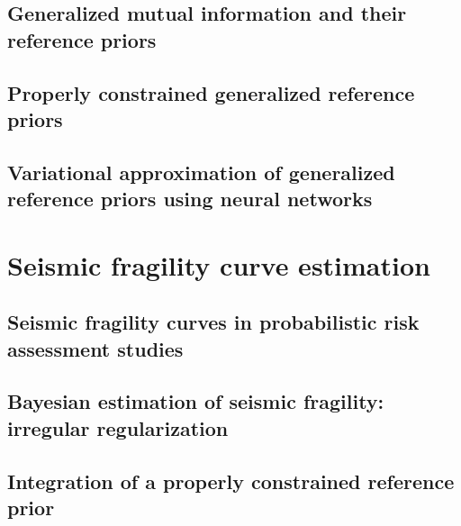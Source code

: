 \documentclass[a4paper]{book}
\begin{document}


\chapter{Generalized mutual information and their reference priors}\label{chap:ref-generalized}




\chapter{Properly constrained generalized reference priors}\label{chap:constrained-prior}




\chapter{Variational approximation of generalized reference priors using neural networks}\label{chap:varp}




\part{Seismic fragility curve estimation}\label{part:spra}


\chapter{Seismic fragility curves in probabilistic risk assessment studies}\label{chap:frags-intro}




\chapter{Bayesian estimation of seismic fragility: irregular regularization}\label{chap:prem}




\chapter{Integration of a properly constrained reference prior}\label{chap:constrained-frags}
\end{document}
